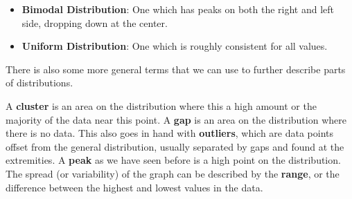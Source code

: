 \begin{itemize}
    \item \textbf{Bimodal Distribution}: One which has peaks on both the right and left side, dropping down at the center.

    \begin{center}
    \end{center}

    \item \textbf{Uniform Distribution}: One which is roughly consistent for all values.

    \begin{center}
    \end{center}
\end{itemize}

There is also some more general terms that we can use to further describe parts of distributions.

\begin{blackbox}
    \begin{definition}
        A \textbf{cluster} is an area on the distribution where this a high
        amount or the majority of the data near this point. A \textbf{gap} is
        an area on the distribution where there is no data. This also goes in
        hand with \textbf{outliers}, which are data points offset from the
        general distribution, usually separated by gaps and found at the
        extremities. A \textbf{peak} as we have seen before is a high point on
        the distribution. The spread (or variability) of the graph can be
        described by the \textbf{range}, or the difference between the highest
        and lowest values in the data.
    \end{definition}
\end{blackbox}

